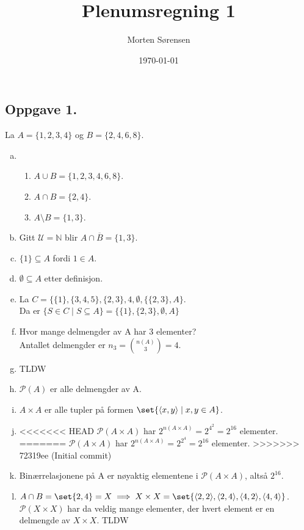 \documentclass{article}
\title{Plenumsregning 1}
\author{Morten Sørensen}
\date{\today}
\begin{document}
\maketitle

\subsection*{Oppgave 1.}
La $A = \{1, 2, 3, 4\}$ og $B = \{2, 4, 6, 8\}$.
\begin{enumerate}[(a)]
    \item {
        \begin{enumerate}[(1)]
            \item $A \cup B = \{1, 2, 3, 4, 6, 8\}$.
            \item $A \cap B = \{2, 4\}$.
            \item $A \setminus B = \{1, 3\}$.
        \end{enumerate} 
    }
    \item {
        Gitt $\mathcal{U} = \mathbb{N}$ blir $A \cap \overline{B} = \{1, 3\}$.
    } 
    \item {
        $\{1\} \subseteq A$ fordi $1 \in A$.
    }
    \item {
        $\emptyset \subseteq A$ etter definisjon.
    }
    \item {
        La $C = \{\{1\}, \{3, 4, 5\}, \{2, 3\}, 4, \emptyset, \{\{2, 3\}, A\}$.\\
        Da er $\{S \in C \mid S \subseteq A\} = \{\{1\}, \{2, 3\}, \emptyset, A\}$
    }
    \item {
        Hvor mange delmengder av A har 3 elementer? \\
        Antallet delmengder er $n_3 = \binom{n(A)}{3} = 4$.
    }
    \item {
        TLDW
    }
    \item {
        $\mathcal{P}(A)$ er alle delmengder av A.
    }
    \item {
        $A \times A$ er alle tupler på formen $\set{\langle x, y \rangle \mid x, y \in A}$.
    }
    \item {
<<<<<<< HEAD
        $\mathcal{P}(A \times A)$ har $2^{n(A \times A)} = 2^{4^2} = 2^{16}$ elementer.
=======
        $\mathcal{P}(A \times A)$ har $2^{n(A \times A)} = 2^{2^4} = 2^{16}$ elementer.
>>>>>>> 72319ee (Initial commit)
    }
    \item {
        Binærrelasjonene på A er nøyaktig elementene i $\mathcal{P}(A \times A)$, altså $2^{16}$.
    }
    \item {
        $A \cap B = \set{2, 4} = X \implies X \times X = \set{\langle 2, 2 \rangle, \langle 2, 4 \rangle, \langle 4, 2 \rangle, \langle 4, 4 \rangle}$. \\
        $\mathcal{P}(X \times X)$ har da veldig mange elementer, der hvert element er en delmengde av $X \times X$. TLDW
    }
\end{enumerate}
\end{document}
